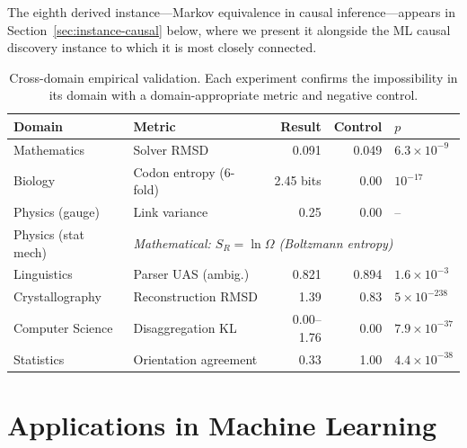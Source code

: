 \documentclass[11pt,a4paper]{article}
\begin{document}














The eighth derived instance---Markov equivalence in causal inference---appears
in Section~\ref{sec:instance-causal} below, where we present it alongside
the ML causal discovery instance to which it is most closely connected.

\begin{table}[t]
\centering
\caption{Cross-domain empirical validation.  Each experiment confirms the impossibility in its domain with a domain-appropriate metric and negative control.}
\label{tab:cross-domain}
\begin{tabular}{llrrl}
\toprule
Domain & Metric & Result & Control & $p$ \\
\midrule
Mathematics & Solver RMSD & 0.091 & 0.049 & $6.3{\times}10^{-9}$ \\
Biology & Codon entropy (6-fold) & 2.45 bits & 0.00 & $10^{-17}$ \\
Physics (gauge) & Link variance & 0.25 & 0.00 & -- \\
Physics (stat mech) & \multicolumn{4}{l}{\textit{Mathematical: $S_R = \ln\Omega$ (Boltzmann entropy)}} \\
Linguistics & Parser UAS (ambig.) & 0.821 & 0.894 & $1.6{\times}10^{-3}$ \\
Crystallography & Reconstruction RMSD & 1.39 & 0.83 & $5{\times}10^{-238}$ \\
Computer Science & Disaggregation KL & 0.00--1.76 & 0.00 & $7.9{\times}10^{-37}$ \\
Statistics & Orientation agreement & 0.33 & 1.00 & $4.4{\times}10^{-38}$ \\
\bottomrule
\end{tabular}
\end{table}

\section{Applications in Machine Learning}
\label{sec:ml-instances}
\end{document}
